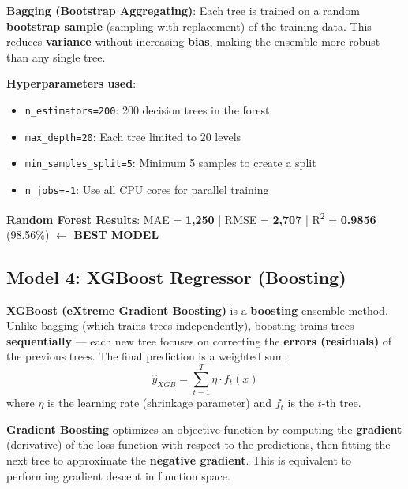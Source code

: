 \documentclass[12pt, a4paper]{article}
\newcommand{\rupee}{\text{₹}}
\begin{document}
\begin{keyterm}
\textbf{Bagging (Bootstrap Aggregating)}: Each tree is trained on a random \textbf{bootstrap sample} (sampling with replacement) of the training data. This reduces \textbf{variance} without increasing \textbf{bias}, making the ensemble more robust than any single tree.
\end{keyterm}

\textbf{Hyperparameters used}:
\begin{itemize}[leftmargin=*]
    \item \texttt{n\_estimators=200}: 200 decision trees in the forest
    \item \texttt{max\_depth=20}: Each tree limited to 20 levels
    \item \texttt{min\_samples\_split=5}: Minimum 5 samples to create a split
    \item \texttt{n\_jobs=-1}: Use all CPU cores for parallel training
\end{itemize}

\begin{resultbox}
\textbf{Random Forest Results}: MAE = \rupee\textbf{1,250} \quad | \quad RMSE = \rupee\textbf{2,707} \quad | \quad R\textsuperscript{2} = \textbf{0.9856} (98.56\%) \quad $\leftarrow$ \textbf{BEST MODEL}
\end{resultbox}

\subsection{Model 4: XGBoost Regressor (Boosting)}

\begin{keyterm}
\textbf{XGBoost (eXtreme Gradient Boosting)} is a \textbf{boosting} ensemble method. Unlike bagging (which trains trees independently), boosting trains trees \textbf{sequentially} — each new tree focuses on correcting the \textbf{errors (residuals)} of the previous trees. The final prediction is a weighted sum:
\[
    \hat{y}_{XGB} = \sum_{t=1}^{T} \eta \cdot f_t(x)
\]
where $\eta$ is the learning rate (shrinkage parameter) and $f_t$ is the $t$-th tree.
\end{keyterm}

\begin{keyterm}
\textbf{Gradient Boosting} optimizes an objective function by computing the \textbf{gradient} (derivative) of the loss function with respect to the predictions, then fitting the next tree to approximate the \textbf{negative gradient}. This is equivalent to performing gradient descent in function space.
\end{keyterm}
\end{document}
